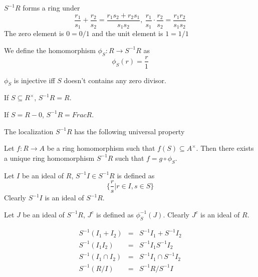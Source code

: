 \documentclass[12pt]{book}
\begin{document}
	$S^{-1}R$ forms a ring under 
	\begin{equation}
		\frac {r_1}{s_1}+\frac {r_2}{s_2}=\frac {r_1s_2+r_2s_1}{s_1s_2},\ \frac {r_1}{s_1}\cdot\frac {r_2}{s_2}=\frac {r_1r_2}{s_1s_2}
	\end{equation}
	The zero element is $0=0/1$ and the unit element is $1=1/1$
	
	\begin{definition}
		We define the homomorphism $\phi_S:R\rightarrow S^{-1}R$ as 
		\begin{equation}
			\phi_S(r)=\frac r 1
		\end{equation}
	\end{definition}
	
	\begin{lemma}
		$\phi_S$ is injective iff $S$ doesn't contains any zero divisor.
	\end{lemma}
	
	If $S\subseteq R^\times$, $S^{-1}R=R$.
	
	If $S=R-0$, $S^{-1}R=Frac R$.
	
	The localization $S^{-1}R$ has the following universal property
	\begin{theorem}
		Let $f:R\rightarrow A$ be a ring homomorphism such that $f(S)\subseteq A^\times$. Then there exists a unique ring homomorphism $S^{-1}R$ such that $f=g\circ \phi_S$.
	\end{theorem}
	
	\begin{definition}
		Let $I$ be an ideal of $R$, $S^{-1}I\in S^{-1}R$ is defined as
		\begin{equation}
			\{\frac rs |r\in I, s\in S \}
		\end{equation}
		Clearly $S^{-1}I$ is an ideal of $S^{-1}R$.
		
		Let $J$ be an ideal of $S^{-1}R$, $J^c$ is defined as $\phi_S^{-1}(J)$. Clearly $J^c$ is an ideal of $R$.
	\end{definition}
	
	\begin{lemma}
		\begin{eqnarray}
			S^{-1}(I_1+I_2)&=& S^{-1}I_1+S^{-1}I_2\\
			S^{-1}(I_1I_2)&=& S^{-1}I_1S^{-1}I_2\\
			S^{-1}(I_1\cap I_2)&=& S^{-1}I_1\cap S^{-1}I_2\\
			S^{-1}(R/I)&=&S^{-1}R/S^{-1}I
		\end{eqnarray}
	\end{lemma}
	
\end{document}
